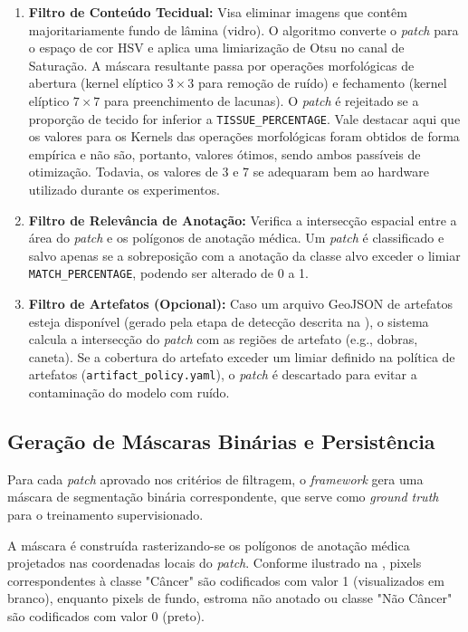\begin{enumerate}
    \item \textbf{Filtro de Conteúdo Tecidual:} Visa eliminar imagens que contêm majoritariamente fundo de lâmina (vidro). O algoritmo converte o \textit{patch} para o espaço de cor HSV e aplica uma limiarização de Otsu no canal de Saturação. A máscara resultante passa por operações morfológicas de abertura (kernel elíptico $3\times3$ para remoção de ruído) e fechamento (kernel elíptico $7\times7$ para preenchimento de lacunas). O \textit{patch} é rejeitado se a proporção de tecido for inferior a \texttt{TISSUE\_PERCENTAGE}. Vale destacar aqui que os valores para os Kernels das operações morfológicas foram obtidos de forma empírica e não são, portanto, valores ótimos, sendo ambos passíveis de otimização. Todavia, os valores de 3 e 7 se adequaram bem ao hardware utilizado durante os experimentos.
    
    \item \textbf{Filtro de Relevância de Anotação:} Verifica a intersecção espacial entre a área do \textit{patch} e os polígonos de anotação médica. Um \textit{patch} é classificado e salvo apenas se a sobreposição com a anotação da classe alvo exceder o limiar \texttt{MATCH\_PERCENTAGE}, podendo ser alterado de 0 a 1.
    
    \item \textbf{Filtro de Artefatos (Opcional):} Caso um arquivo GeoJSON de artefatos esteja disponível (gerado pela etapa de detecção descrita na ), o sistema calcula a intersecção do \textit{patch} com as regiões de artefato (e.g., dobras, caneta). Se a cobertura do artefato exceder um limiar definido na política de artefatos (\texttt{artifact\_policy.yaml}), o \textit{patch} é descartado para evitar a contaminação do modelo com ruído.
\end{enumerate}

\subsection{Geração de Máscaras Binárias e Persistência}\label{subsec:met_mascaras_binarias}

Para cada \textit{patch} aprovado nos critérios de filtragem, o \textit{framework} gera uma máscara de segmentação binária correspondente, que serve como \textit{ground truth} para o treinamento supervisionado.

A máscara é construída rasterizando-se os polígonos de anotação médica projetados nas coordenadas locais do \textit{patch}. Conforme ilustrado na , pixels correspondentes à classe "Câncer" são codificados com valor 1 (visualizados em branco), enquanto pixels de fundo, estroma não anotado ou classe "Não Câncer" são codificados com valor 0 (preto).

